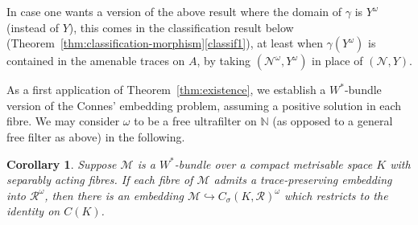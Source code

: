 \documentclass[a4paper,11pt]{amsart}
\newtheorem{corollary}[theorem]{Corollary}
\theoremstyle{definition}
\numberwithin{equation}{section}
\numberwithin{theorem}{section}
\begin{document}
In case one wants a version of the above result where the domain of $\gamma$ is $Y^\omega$ (instead of $Y$), this comes in the classification result below (Theorem~\ref{thm:classification-morphism}\ref{classif1}), at least when $\gamma(Y^\omega)$ is contained in the amenable traces on $A$, by taking $(\mathcal N^\omega, Y^\omega)$ in place of $(\mathcal N,Y)$.

As a first application of Theorem~\ref{thm:existence}, we establish a $W^*$-bundle version of the Connes' embedding problem, assuming a positive solution in each fibre.
We may consider $\omega$ to be a free ultrafilter on $\mathbb N$ (as opposed to a general free filter as above) in the following.

\begin{corollary}\label{cor:ConnesEmbedding}
	Suppose $\mathcal M$ is a $W^*$-bundle over a compact metrisable space $K$ with separably acting fibres.  If each fibre of $\mathcal M$ admits a trace-preserving embedding into $\mathcal R^\omega$, then there is an embedding $\mathcal M \hookrightarrow C_\sigma(K, \mathcal R)^\omega$ which restricts to the identity on $C(K)$.
\end{corollary}
\end{document}
